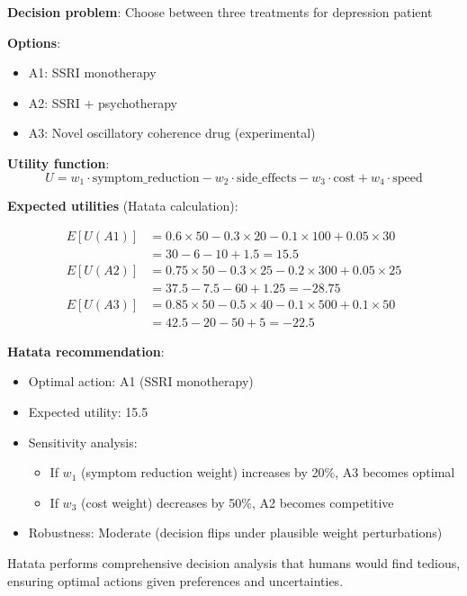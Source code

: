 \begin{example}
\textbf{Decision problem}: Choose between three treatments for depression patient

\textbf{Options}:
\begin{itemize}
\item A1: SSRI monotherapy
\item A2: SSRI + psychotherapy
\item A3: Novel oscillatory coherence drug (experimental)
\end{itemize}

\textbf{Utility function}:
\begin{equation}
U = w_1 \cdot \text{symptom\_reduction} - w_2 \cdot \text{side\_effects} - w_3 \cdot \text{cost} + w_4 \cdot \text{speed}
\end{equation}

\textbf{Expected utilities} (Hatata calculation):

\begin{align}
E[U(A1)] &= 0.6 \times 50 - 0.3 \times 20 - 0.1 \times 100 + 0.05 \times 30 \\
         &= 30 - 6 - 10 + 1.5 = 15.5 \\
E[U(A2)] &= 0.75 \times 50 - 0.3 \times 25 - 0.2 \times 300 + 0.05 \times 25 \\
         &= 37.5 - 7.5 - 60 + 1.25 = -28.75 \\
E[U(A3)] &= 0.85 \times 50 - 0.5 \times 40 - 0.1 \times 500 + 0.1 \times 50 \\
         &= 42.5 - 20 - 50 + 5 = -22.5
\end{align}

\textbf{Hatata recommendation}:
\begin{itemize}
\item Optimal action: A1 (SSRI monotherapy)
\item Expected utility: 15.5
\item Sensitivity analysis:
    \begin{itemize}
    \item If $w_1$ (symptom reduction weight) increases by 20\%, A3 becomes optimal
    \item If $w_3$ (cost weight) decreases by 50\%, A2 becomes competitive
    \end{itemize}
\item Robustness: Moderate (decision flips under plausible weight perturbations)
\end{itemize}

Hatata performs comprehensive decision analysis that humans would find tedious, ensuring optimal actions given preferences and uncertainties.
\end{example}

